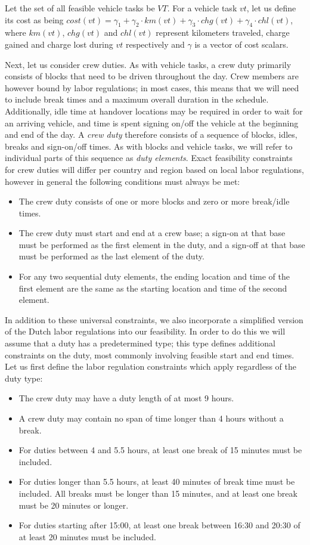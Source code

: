 \documentclass[]{article}
\begin{document}
Let the set of all feasible vehicle tasks be $VT$. For a vehicle task $vt$, let us define its cost as being $cost(vt) = \gamma_1 + \gamma_2 \cdot km(vt) + \gamma_3 \cdot chg(vt) + \gamma_4 \cdot chl(vt)$, where $km(vt)$, $chg(vt)$ and $chl(vt)$ represent kilometers traveled, charge gained and charge lost during $vt$ respectively and $\gamma$ is a vector of cost scalars.

Next, let us consider crew duties. As with vehicle tasks, a crew duty primarily consists of blocks that need to be driven throughout the day. Crew members are however bound by labor regulations; in most cases, this means that we will need to include break times and a maximum overall duration in the schedule. Additionally, idle time at handover locations may be required in order to wait for an arriving vehicle, and time is spent signing on/off the vehicle at the beginning and end of the day. A \textit{crew duty} therefore consists of a sequence of blocks, idles, breaks and sign-on/off times. As with blocks and vehicle tasks, we will refer to individual parts of this sequence as \emph{duty elements}. Exact feasibility constraints for crew duties will differ per country and region based on local labor regulations, however in general the following conditions must always be met: 
\begin{itemize}
  \item The crew duty consists of one or more blocks and zero or more break/idle times.
  \item The crew duty must start and end at a crew base; a sign-on at that base must be performed as the first element in the duty, and a sign-off at that base must be performed as the last element of the duty.
  \item For any two sequential duty elements, the ending location and time of the first element are the same as the starting location and time of the second element.
\end{itemize}
In addition to these universal constraints, we also incorporate a simplified version of the Dutch labor regulations into our feasibility. In order to do this we will assume that a duty has a predetermined type; this type defines additional constraints on the duty, most commonly involving feasible start and end times. Let us first define the labor regulation constraints which apply regardless of the duty type:
\begin{itemize}
  \item The crew duty may have a duty length of at most 9 hours. 
  \item A crew duty may contain no span of time longer than 4 hours without a break.
  \item For duties between 4 and 5.5 hours, at least one break of 15 minutes must be included. 
  \item For duties longer than 5.5 hours, at least 40 minutes of break time must be included. All breaks must be longer than 15 minutes, and at least one break must be 20 minutes or longer.
  \item For duties starting after 15:00, at least one break between 16:30 and 20:30 of at least 20 minutes must be included. 
\end{itemize}
\end{document}
